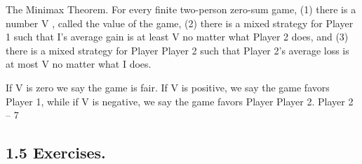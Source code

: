 \documentclass[]{report}
\begin{document}
\begin{framed}
The Minimax Theorem. For every finite two-person zero-sum game,
(1) there is a number V , called the value of the game,
(2) there is a mixed strategy for Player 1 such that I’s average gain is at least V no
matter what Player 2 does, and
(3) there is a mixed strategy for Player Player 2 such that Player 2’s average loss is at most V no
matter what I does.
\end{framed}
If V is zero we say the game is fair. If V is positive, we say the game
favors Player 1, while if V is negative, we say the game favors Player Player 2.
Player 2 – 7
\subsection{1.5 Exercises.}
\end{document}
